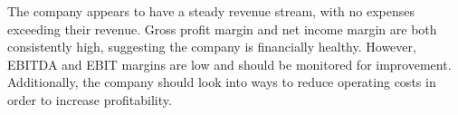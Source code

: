 

The company appears to have a steady revenue stream, with no expenses exceeding their revenue. Gross profit margin and net income margin are both consistently high, suggesting the company is financially healthy. However, EBITDA and EBIT margins are low and should be monitored for improvement. Additionally, the company should look into ways to reduce operating costs in order to increase profitability.